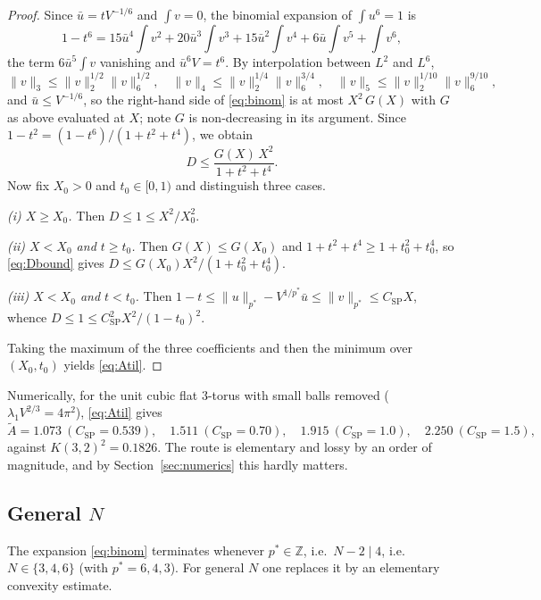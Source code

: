 \documentclass[11pt,reqno]{amsart}
\theoremstyle{plain}
\theoremstyle{definition}
\newcommand{\pstar}{p^{*}}
\newcommand{\Ksob}{K}
\newcommand{\Csp}{C_{\mathrm{SP}}}
\newcommand{\Atil}{\widetilde{A}}
\begin{document}
\begin{proof}
Since $\bar u=tV^{-1/6}$ and $\int v=0$, the binomial expansion of $\int u^6=1$ is
\begin{equation}
\label{eq:binom}
  1-t^6=15\bar u^4\!\int\! v^2+20\bar u^3\!\int\! v^3+15\bar u^2\!\int\! v^4
        +6\bar u\!\int\! v^5+\int\! v^6 ,
\end{equation}
the term $6\bar u^5\int v$ vanishing and $\bar u^6V=t^6$. By interpolation between
$L^2$ and $L^6$,
\[
  \|v\|_3\le\|v\|_2^{1/2}\|v\|_6^{1/2},\quad
  \|v\|_4\le\|v\|_2^{1/4}\|v\|_6^{3/4},\quad
  \|v\|_5\le\|v\|_2^{1/10}\|v\|_6^{9/10},
\]
and $\bar u\le V^{-1/6}$, so the right-hand side of \eqref{eq:binom} is at most
$X^2\,G(X)$ with $G$ as above evaluated at $X$; note $G$ is non-decreasing in its
argument. Since $1-t^2=(1-t^6)/(1+t^2+t^4)$, we obtain
\begin{equation}
\label{eq:Dbound}
  D\le\frac{G(X)\,X^2}{1+t^2+t^4}.
\end{equation}
Now fix $X_0>0$ and $t_0\in[0,1)$ and distinguish three cases.

\emph{(i) $X\ge X_0$.} Then $D\le1\le X^2/X_0^2$.

\emph{(ii) $X<X_0$ and $t\ge t_0$.} Then $G(X)\le G(X_0)$ and
$1+t^2+t^4\ge1+t_0^2+t_0^4$, so \eqref{eq:Dbound} gives
$D\le G(X_0)X^2/(1+t_0^2+t_0^4)$.

\emph{(iii) $X<X_0$ and $t<t_0$.} Then
$1-t\le\|u\|_{\pstar}-V^{1/\pstar}\bar u\le\|v\|_{\pstar}\le\Csp X$, whence
$D\le1\le\Csp^2X^2/(1-t_0)^2$.

Taking the maximum of the three coefficients and then the minimum over
$(X_0,t_0)$ yields \eqref{eq:Atil}.
\end{proof}

Numerically, for the unit cubic flat $3$-torus with small balls removed
($\lambda_1V^{2/3}=4\pi^2$), \eqref{eq:Atil} gives
\[
  \Atil=1.073\ (\Csp=0.539),\quad
  1.511\ (\Csp=0.70),\quad
  1.915\ (\Csp=1.0),\quad
  2.250\ (\Csp=1.5),
\]
against $\Ksob(3,2)^2=0.1826$. The route is elementary and lossy by an order of
magnitude, and by Section~\ref{sec:numerics} this hardly matters.

\subsection{General \texorpdfstring{$N$}{N}}
The expansion \eqref{eq:binom} terminates whenever $\pstar\in\mathbb{Z}$, i.e.\
$N-2\mid4$, i.e.\ $N\in\{3,4,6\}$ (with $\pstar=6,4,3$). For general $N$ one
replaces it by an elementary convexity estimate.
\end{document}
